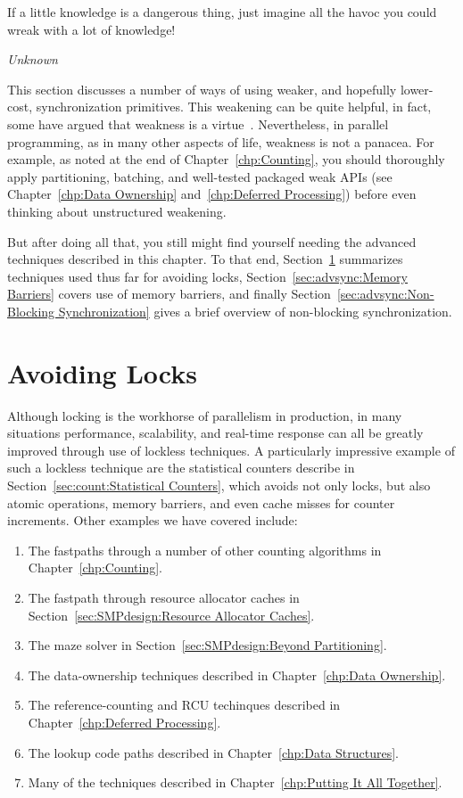 

\epigraph{If a little knowledge is a dangerous thing, just imagine all
	  the havoc you could wreak with a lot of knowledge!}{\emph{Unknown}}

This section discusses a number of ways of using weaker, and hopefully
lower-cost, synchronization primitives.
This weakening can be quite helpful, in fact, some have argued
that weakness is a virtue~\cite{JadeAlglave2013-WeaknessIsVirtue}.
Nevertheless, in parallel programming, as in many other aspects
of life, weakness is not a panacea.
For example, as noted at the end of
Chapter~\ref{chp:Counting},
you should thoroughly apply partitioning, batching, and
well-tested packaged weak APIs (see Chapter~\ref{chp:Data Ownership}
and~\ref{chp:Deferred Processing})
before even thinking about unstructured weakening.

But after doing all that, you still might find yourself needing the
advanced techniques described in this chapter.
To that end,
Section~\ref{sec:advsync:Avoiding Locks}
summarizes techniques used thus far for avoiding locks,
Section~\ref{sec:advsync:Memory Barriers}
covers use of memory barriers, and finally
Section~\ref{sec:advsync:Non-Blocking Synchronization}
gives a brief overview of non-blocking synchronization.

\section{Avoiding Locks}
\label{sec:advsync:Avoiding Locks}

Although locking is the workhorse of parallelism in production, in
many situations performance, scalability, and real-time response can
all be greatly improved through use of lockless techniques.
A particularly impressive example of such a lockless technique are
the statistical counters describe in
Section~\ref{sec:count:Statistical Counters},
which avoids not only locks, but also atomic operations, memory barriers,
and even cache misses for counter increments.
Other examples we have covered include:

\begin{enumerate}
\item	The fastpaths through a number of other counting algorithms
	in Chapter~\ref{chp:Counting}.
\item	The fastpath through resource allocator caches in
	Section~\ref{sec:SMPdesign:Resource Allocator Caches}.
\item	The maze solver in Section~\ref{sec:SMPdesign:Beyond Partitioning}.
\item	The data-ownership techniques described in
	Chapter~\ref{chp:Data Ownership}.
\item	The reference-counting and RCU techinques described in
	Chapter~\ref{chp:Deferred Processing}.
\item	The lookup code paths described in Chapter~\ref{chp:Data Structures}.
\item	Many of the techniques described in
	Chapter~\ref{chp:Putting It All Together}.
\end{enumerate}

